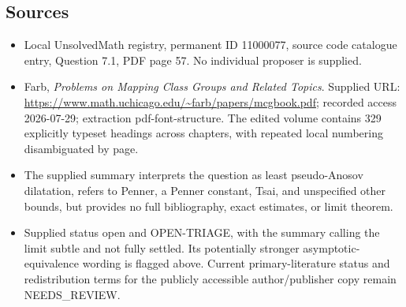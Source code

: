 \documentclass[11pt]{article}
\begin{document}
\subsection{Sources}
\begin{itemize}
\item Local UnsolvedMath registry, permanent ID 11000077, source code catalogue entry, Question 7.1, PDF page 57. No individual proposer is supplied.
\item Farb, \emph{Problems on Mapping Class Groups and Related Topics}. Supplied URL: \url{https://www.math.uchicago.edu/~farb/papers/mcgbook.pdf}; recorded access 2026-07-29; extraction pdf-font-structure. The edited volume contains 329 explicitly typeset headings across chapters, with repeated local numbering disambiguated by page.
\item The supplied summary interprets the question as least pseudo-Anosov dilatation, refers to Penner, a Penner constant, Tsai, and unspecified other bounds, but provides no full bibliography, exact estimates, or limit theorem.
\item Supplied status open and OPEN-TRIAGE, with the summary calling the limit subtle and not fully settled. Its potentially stronger asymptotic-equivalence wording is flagged above. Current primary-literature status and redistribution terms for the publicly accessible author/publisher copy remain NEEDS\_REVIEW.
\end{itemize}
\end{document}
